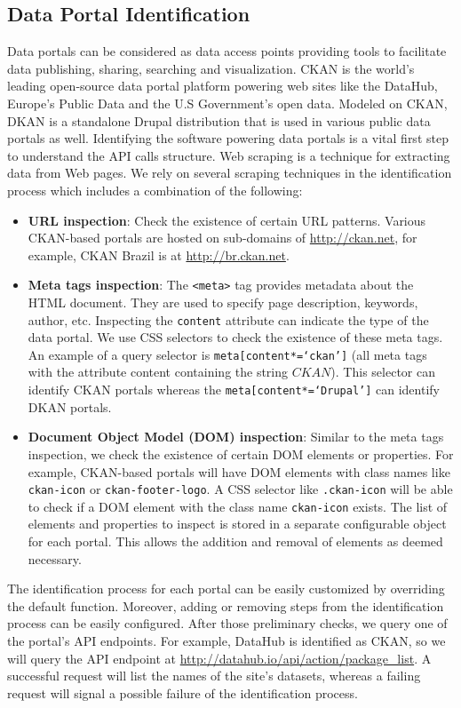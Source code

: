 \documentclass{../../Util/LaTEX/sig-alternate}
\begin{document}
\subsection{Data Portal Identification}
Data portals can be considered as data access points providing tools to facilitate data publishing, sharing, searching and visualization. CKAN is the world's leading open-source data portal platform powering web sites like the DataHub, Europe's Public Data and the U.S Government's open data. Modeled on CKAN, DKAN is a standalone Drupal distribution that is used in various public data portals as well. Identifying the software powering data portals is a vital first step to understand the API calls structure. Web scraping is a technique for extracting data from Web pages. We rely on several scraping techniques in the identification process which includes a combination of the following:
\begin{itemize}
  \item \textbf{URL inspection}: Check the existence of certain URL patterns. Various CKAN-based portals are hosted on sub-domains of \url{http://ckan.net}, for example, CKAN Brazil is at \url{http://br.ckan.net}.
  \item \textbf{Meta tags inspection}: The \texttt{<meta>} tag provides metadata about the HTML document. They are used to specify page description, keywords, author, etc. Inspecting the \texttt{content} attribute can indicate the type of the data portal. We use CSS selectors to check the existence of these meta tags. An example of a query selector is \texttt{meta[content*=`ckan']} (all meta tags with the attribute content containing the string $CKAN$). This selector can identify CKAN portals whereas the \texttt{meta[content*=`Drupal']} can identify DKAN portals.
  \item \textbf{Document Object Model (DOM) inspection}: Similar to the meta tags inspection, we check the existence of certain DOM elements or properties. For example, CKAN-based portals will have DOM elements with class names like \texttt{ckan-icon} or \texttt{ckan-footer-logo}. A CSS selector like \texttt{.ckan-icon} will be able to check if a DOM element with the class name \texttt{ckan-icon} exists. The list of elements and properties to inspect is stored in a separate configurable object for each portal. This allows the addition and removal of elements as deemed necessary.
\end{itemize}

The identification process for each portal can be easily customized by overriding the default function. Moreover, adding or removing steps from the identification process can be easily configured. After those preliminary checks, we query one of the portal's API endpoints. For example, DataHub is identified as CKAN, so we will query the API endpoint at \url{http://datahub.io/api/action/package_list}. A successful request will list the names of the site's datasets, whereas a failing request will signal a possible failure of the identification process.
\end{document}
